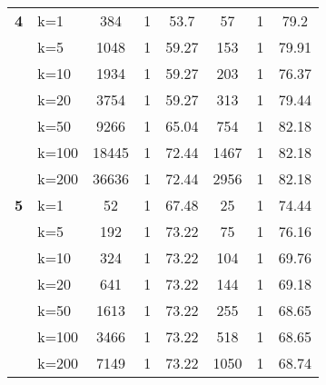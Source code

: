 \begin{table}[htbp]
\begin{tabular}{|l|l|c|c|c|c|c|c|}
    \multicolumn{1}{|r|}{\textbf{4}} & k=1 & 384 & 1 & 53.7 & 57 & 1 & 79.2 \\ 
     & k=5 & 1048 & 1 & 59.27 & 153 & 1 & 79.91 \\ 
     & k=10 & 1934 & 1 & 59.27 & 203 & 1 & 76.37 \\ 
     & k=20 & 3754 & 1 & 59.27 & 313 & 1 & 79.44 \\ 
     & k=50 & 9266 & 1 & 65.04 & 754 & 1 & 82.18 \\ 
     & k=100 & 18445 & 1 & 72.44 & 1467 & 1 & 82.18 \\ 
     & k=200 & 36636 & 1 & 72.44 & 2956 & 1 & 82.18 \\ \hline
    \multicolumn{1}{|r|}{\textbf{5}} & k=1 & 52 & 1 & 67.48 & 25 & 1 & 74.44 \\ 
     & k=5 & 192 & 1 & 73.22 & 75 & 1 & 76.16 \\ 
     & k=10 & 324 & 1 & 73.22 & 104 & 1 & 69.76 \\ 
     & k=20 & 641 & 1 & 73.22 & 144 & 1 & 69.18 \\ 
     & k=50 & 1613 & 1 & 73.22 & 255 & 1 & 68.65 \\ 
     & k=100 & 3466 & 1 & 73.22 & 518 & 1 & 68.65 \\ 
     & k=200 & 7149 & 1 & 73.22 & 1050 & 1 & 68.74 \\ \hline
    \end{tabular}
    \end{table}
